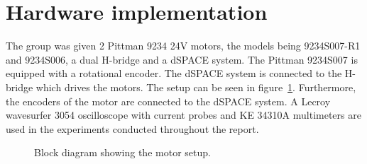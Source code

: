 \section{Hardware implementation}
The group was given 2 Pittman 9234 24V motors, the models being 9234S007-R1 and 9234S006, a dual H-bridge and a dSPACE system.
The Pittman 9234S007 is equipped with a rotational encoder.
The dSPACE system is connected to the H-bridge which drives the motors. 
The setup can be seen in figure~\ref{fig:implementation_block}.
Furthermore, the encoders of the motor are connected to the dSPACE system.
A Lecroy wavesurfer 3054 oscilloscope with current probes and KE 34310A multimeters are used in the experiments conducted throughout the report.

\begin{figure}[!h]
\centering

  \caption{Block diagram showing the motor setup.}
  \label{fig:implementation_block}
\end{figure}

